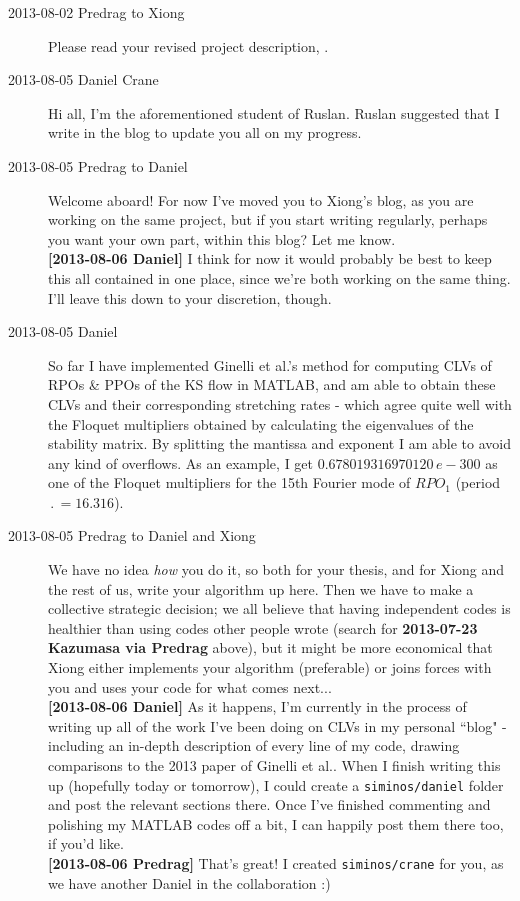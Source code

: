 \begin{description}
\item[2013-08-02 Predrag to Xiong] Please read your revised project
    description, .

\item[2013-08-05 Daniel Crane] Hi all, I'm the aforementioned student of
Ruslan. Ruslan suggested that I write in the blog to update you all on my
progress.

\item[2013-08-05 Predrag to Daniel] Welcome aboard! For now I've moved
you to Xiong's blog, as you are working on the same project, but if you
start writing regularly, perhaps you want your own part, within this
blog? Let me know. \\
{\bf [2013-08-06 Daniel]} I think for now it would probably be best to
keep this all contained in one place, since we're both working on the
same thing. I'll leave this down to your discretion, though.

\item[2013-08-05 Daniel]
So far I have implemented Ginelli et al.'s method for computing CLVs of
RPOs \& PPOs of the KS flow in MATLAB, and am able to obtain these CLVs
and their corresponding stretching rates - which agree quite well with
the Floquet multipliers obtained by calculating the eigenvalues of the
stability matrix. By splitting the mantissa and exponent I am able to
avoid any kind of overflows. As an example, I get
$0.678019316970120\,e-300$
as one of the Floquet multipliers for the 15th Fourier mode of $RPO_1$
(period $\period{}=16.316$).

\item[2013-08-05 Predrag to Daniel and Xiong] We have no idea \emph{how}
you do it, so both for your thesis, and for Xiong and the rest of us,
write your algorithm up here. Then we have to make a collective strategic
decision; we all believe that having independent codes is healthier than
using codes other people wrote (search for {\bf 2013-07-23 Kazumasa via
Predrag} above), but it might be more economical that Xiong either
implements your algorithm (preferable) or joins forces with you and uses
your code for what comes next...
\\
{\bf [2013-08-06 Daniel]} As it happens, I'm currently in the process of
writing up all of the work I've been doing on CLVs in my personal ``blog"
- including an in-depth description of every line of my code, drawing
comparisons to the 2013 paper of Ginelli et al..
When I finish writing this up (hopefully today or tomorrow),
I could create a \texttt{siminos/daniel} folder and post the relevant sections there.
Once I've finished commenting and polishing my MATLAB codes off a bit,
I can happily post them there too, if you'd like.
\\
{\bf [2013-08-06 Predrag]} That's great! I created \texttt{siminos/crane} for you,
as we have another Daniel in the collaboration :)


\end{description}
